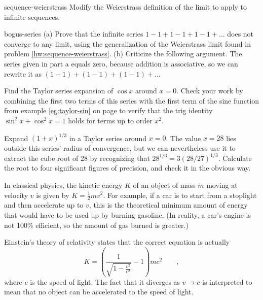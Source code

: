 \begin{hwsection}
\begin{hwwithsoln}{sequence-weierstrass}
Modify the Weierstrass definition of the limit to apply to infinite sequences.
\end{hwwithsoln}

\begin{hwwithsoln}{bogus-series}
(a) Prove that the infinite series $1-1+1-1+1-1+\ldots$ does not converge to any limit, using the generalization
of the Weierstrass limit found in problem \ref{hw:sequence-weierstrass}.
(b) Criticize the following argument. The series given in part a equals zero, because addition is associative, so we can
rewrite it as $(1-1)+(1-1)+(1-1)+\ldots$
\end{hwwithsoln}

\begin{hw}
Find the Taylor series expansion of $\cos x$ around $x=0$. Check your work by combining the first two
terms of this series with the first term of the sine function from example \ref{eg:taylor-sin}
on page \pageref{eg:taylor-sin} to verify that the trig identity $\sin^2 x+\cos^2 x=1$ holds
for terms up to order $x^2$.
\end{hw}

\begin{hw}
Expand $(1+x)^{1/3}$ in a Taylor series around $x=0$. The value $x=28$ lies outside
this series' radius of convergence, but we can nevertheless use it to
extract the cube root of 28 by recognizing that $28^{1/3}=3(28/27)^{1/3}$.
Calculate the root to four significant figures of precision, and check it
in the obvious way.
\end{hw}

\pagebreak

\begin{hw}
In classical physics, the kinetic energy $K$ of an object of mass $m$ moving at velocity $v$
is given by $K=\frac{1}{2}mv^2$. For example, if a car is to start from a stoplight and then
accelerate up to $v$, this is
the theoretical minimum amount of energy  that would have to be used up by burning gasoline.
(In reality, a car's engine is not 100\% efficient, so the amount of gas burned is greater.)

Einstein's theory of relativity states that the correct equation is actually
\begin{equation*}
  K = \left(\frac{1}{\sqrt{1-\frac{v^2}{c^2}}}-1\right)mc^2 \qquad ,
\end{equation*}
where $c$ is the speed of light. The fact that it diverges as $v \rightarrow c$ is interpreted
to mean that no object can be accelerated to the speed of light.


\end{hw}
\end{hwsection}
